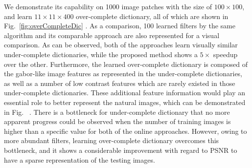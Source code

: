 We demonstrate its capability on 1000 image patches with the size of $100 \times 100$, and learn $11 \times 11 \times 400$ over-complete dictionary, all of which are shown in Fig.~\ref{fig:overCompleteDic} . As a comparison, 100 learned filters by the same algorithm and its comparable approach are also represented for a visual comparison. As can be observed, both of the approaches learn visually similar under-complete dictionaries, while the proposed method shows a $5 \times$ speedup over the other. Furthermore, the learned over-complete dictionary is composed of the gabor-like image features as represented in the under-complete dictionaries, as well as a number of low contrast features which are rarely existed in those under-complete dictionaries. These additional feature information would play an essential role to better represent the natural images, which can be demonstrated in Fig.~ . There is a bottleneck for under-complete dictionary that no more apparent progress could be observed when the number of training images is higher than a specific value for both of the online approaches. However, owing to more abundant filters, learning over-complete dictionary overcomes this bottleneck, and it shows a considerable improvement with regard to PSNR to have a sparse representation of the testing images.

